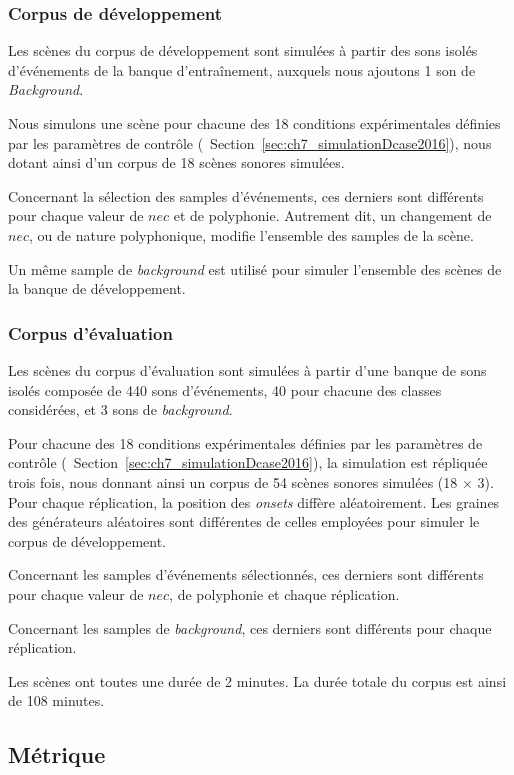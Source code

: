 \subsubsection{Corpus de développement}

Les scènes du corpus de développement sont simulées à partir des sons isolés d'événements de la banque d’entraînement, auxquels nous ajoutons 1 son de \emph{Background}.

Nous simulons une scène pour chacune des 18 conditions expérimentales définies par les paramètres de contrôle (\cf~Section~\ref{sec:ch7_simulationDcase2016}), nous dotant ainsi d'un corpus de 18 scènes sonores simulées.

Concernant la sélection des samples d'événements, ces derniers sont différents pour chaque valeur de $nec$ et de polyphonie. Autrement dit, un changement de $nec$, ou de nature polyphonique, modifie l'ensemble des samples de la scène. 

Un même sample de \emph{background} est utilisé pour simuler l'ensemble des scènes de la banque de développement.

\subsubsection{Corpus d'évaluation}

Les scènes du corpus d'évaluation sont simulées à partir d'une banque de sons isolés composée de 440 sons d'événements, 40 pour chacune des classes considérées, et 3 sons de \emph{background}.

Pour chacune des 18 conditions expérimentales définies par les paramètres de contrôle (\cf~Section~\ref{sec:ch7_simulationDcase2016}), la simulation est répliquée trois fois, nous donnant ainsi un corpus de 54 scènes sonores simulées (18 $\times$ 3). Pour chaque réplication, la position des \emph{onsets} diffère aléatoirement. Les graines des générateurs aléatoires sont différentes de celles employées pour simuler le corpus de développement.

Concernant les samples d'événements sélectionnés, ces derniers sont différents pour chaque valeur de $nec$, de polyphonie et chaque réplication. 
 
Concernant les samples de \emph{background}, ces derniers sont différents pour chaque réplication. 

Les scènes ont toutes une durée de 2 minutes. La durée totale du corpus est ainsi de 108 minutes.

\subsection{Métrique}

